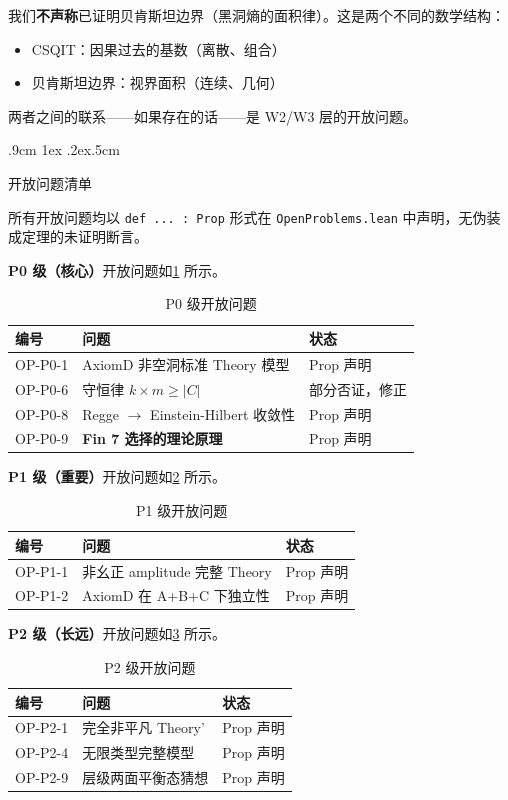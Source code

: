 \documentclass[aps,prd,twocolumn,nofootinbib,floatfix]{revtex4-2}
\makeatletter
\def\subsection{%
  \@startsection{subsection}{2}{\z@}
    {.9cm \@plus1ex \@minus .2ex}{.5cm}
    {\normalfont\large\bfseries\raggedright}%
}
\makeatother
\begin{document}
我们\textbf{不声称}已证明贝肯斯坦边界（黑洞熵的面积律）。这是两个不同的数学结构：
\begin{itemize}
    \item CSQIT：因果过去的基数（离散、组合）
    \item 贝肯斯坦边界：视界面积（连续、几何）
\end{itemize}

两者之间的联系——如果存在的话——是 W2/W3 层的开放问题。

\subsection{开放问题清单}

所有开放问题均以 \texttt{def ... : Prop} 形式在 \texttt{OpenProblems.lean} 中声明，无伪装成定理的未证明断言。

\textbf{P0 级（核心）}开放问题如\cref{tab:p0} 所示。

\begin{table}[!t]
\centering
\begin{tabular}{p{1.5cm}p{4cm}p{2cm}}
\hline
编号 & 问题 & 状态 \\
\hline
OP-P0-1 & AxiomD 非空洞标准 Theory 模型 & Prop 声明 \\
OP-P0-6 & 守恒律 $k \times m \geq |C|$ & 部分否证，修正 \\
OP-P0-8 & Regge $\to$ Einstein-Hilbert 收敛性 & Prop 声明 \\
OP-P0-9 & \textbf{Fin 7 选择的理论原理} & Prop 声明 \\
\hline
\end{tabular}
\caption{P0 级开放问题}
\label{tab:p0}
\end{table}

\textbf{P1 级（重要）}开放问题如\cref{tab:p1} 所示。

\begin{table}[!t]
\centering
\begin{tabular}{p{1.5cm}p{4cm}p{2cm}}
\hline
编号 & 问题 & 状态 \\
\hline
OP-P1-1 & 非幺正 amplitude 完整 Theory & Prop 声明 \\
OP-P1-2 & AxiomD 在 A+B+C 下独立性 & Prop 声明 \\
\hline
\end{tabular}
\caption{P1 级开放问题}
\label{tab:p1}
\end{table}

\textbf{P2 级（长远）}开放问题如\cref{tab:p2} 所示。

\begin{table}[!t]
\centering
\begin{tabular}{p{1.5cm}p{4cm}p{2cm}}
\hline
编号 & 问题 & 状态 \\
\hline
OP-P2-1 & 完全非平凡 Theory' & Prop 声明 \\
OP-P2-4 & 无限类型完整模型 & Prop 声明 \\
OP-P2-9 & 层级两面平衡态猜想 & Prop 声明 \\
\hline
\end{tabular}
\caption{P2 级开放问题}
\label{tab:p2}
\end{table}
\end{document}
